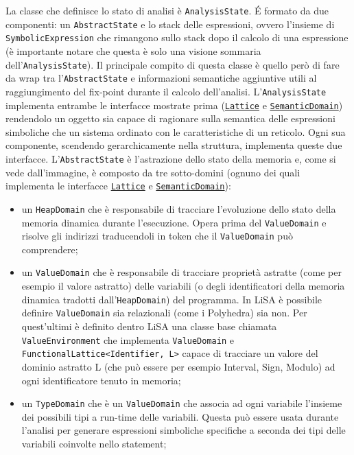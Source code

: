 La classe che definisce lo stato di analisi è \texttt{AnalysisState}. \'E formato da due componenti: un \texttt{AbstractState} e lo stack delle espressioni, ovvero l'insieme di \texttt{SymbolicExpression} che rimangono sullo stack dopo il calcolo di una espressione (è importante notare che questa è solo una visione sommaria dell'\texttt{AnalysisState}). Il principale compito di questa classe è quello però di fare da wrap tra l'\texttt{AbstractState} e informazioni semantiche aggiuntive utili al raggiungimento del fix-point durante il calcolo dell'analisi. L'\texttt{AnalysisState} implementa entrambe le interfacce mostrate prima (\hyperref[subsec:lattice]{\texttt{Lattice}} e \hyperref[subsec:semanticDomain]{\texttt{SemanticDomain}}) rendendolo un oggetto sia capace di ragionare sulla semantica delle espressioni simboliche che un sistema ordinato con le caratteristiche di un reticolo. Ogni sua componente, scendendo gerarchicamente nella struttura, implementa queste due interfacce. L'\texttt{AbstractState} è l'astrazione dello stato della memoria e, come si vede dall'immagine, è composto da tre sotto-domini (ognuno dei quali implementa le interfacce \hyperref[subsec:lattice]{\texttt{Lattice}} e \hyperref[subsec:semanticDomain]{\texttt{SemanticDomain}}): 
\begin{itemize}
\setlength\itemsep{0.1em}
    \item un \texttt{HeapDomain} che è responsabile di tracciare l'evoluzione dello stato della memoria dinamica durante l'esecuzione. Opera prima del \texttt{ValueDomain} e risolve gli indirizzi traducendoli in token che il \texttt{ValueDomain} può comprendere;
    \item un \texttt{ValueDomain} che è responsabile di tracciare proprietà astratte (come per esempio il valore astratto) delle variabili (o degli identificatori della memoria dinamica tradotti dall'\texttt{HeapDomain}) del programma. In LiSA è possibile definire \texttt{ValueDomain} sia relazionali (come i Polyhedra) sia non. Per quest'ultimi è definito dentro LiSA una classe base chiamata \texttt{ValueEnvironment} che implementa \texttt{ValueDomain} e \texttt{FunctionalLattice<Identifier, L>} capace di tracciare un valore del dominio astratto L (che può essere per esempio Interval, Sign, Modulo) ad ogni identificatore tenuto in memoria;
    \item un \texttt{TypeDomain} che è un \texttt{ValueDomain} che associa ad ogni variabile l'insieme dei possibili tipi a run-time delle variabili. Questa può essere usata durante l'analisi per generare espressioni simboliche specifiche a seconda dei tipi delle variabili coinvolte nello statement;
\end{itemize}
